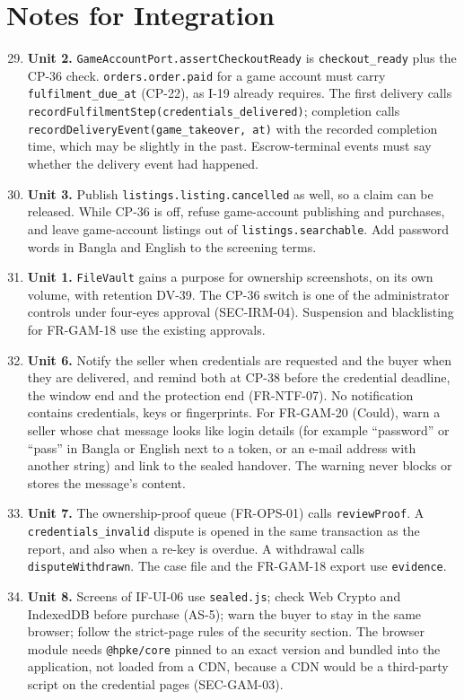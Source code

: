 \documentclass[11pt,a4paper]{article}
\begin{document}
\section{Notes for Integration}
\label{sec:notes}
\begin{enumerate}[label=\textbf{I-\arabic*}, leftmargin=*, nosep]
  \setcounter{enumi}{28}
  \item \textbf{Unit 2.} \texttt{GameAccountPort.assertCheckoutReady} is \texttt{checkout\_ready} plus the CP-36 check. \texttt{orders.order.paid} for a game account must carry \texttt{fulfilment\_due\_at} (CP-22), as I-19 already requires. The first delivery calls \texttt{recordFulfilmentStep(credentials\_delivered)}; completion calls \texttt{recordDeliveryEvent(game\_takeover, at)} with the recorded completion time, which may be slightly in the past. Escrow-terminal events must say whether the delivery event had happened.
  \item \textbf{Unit 3.} Publish \texttt{listings.listing.cancelled} as well, so a claim can be released. While CP-36 is off, refuse game-account publishing and purchases, and leave game-account listings out of \texttt{listings.searchable}. Add password words in Bangla and English to the screening terms.
  \item \textbf{Unit 1.} \texttt{FileVault} gains a purpose for ownership screenshots, on its own volume, with retention DV-39. The CP-36 switch is one of the administrator controls under four-eyes approval (SEC-IRM-04). Suspension and blacklisting for FR-GAM-18 use the existing approvals.
  \item \textbf{Unit 6.} Notify the seller when credentials are requested and the buyer when they are delivered, and remind both at CP-38 before the credential deadline, the window end and the protection end (FR-NTF-07). No notification contains credentials, keys or fingerprints. For FR-GAM-20 (Could), warn a seller whose chat message looks like login details (for example ``password'' or ``pass'' in Bangla or English next to a token, or an e-mail address with another string) and link to the sealed handover. The warning never blocks or stores the message's content.
  \item \textbf{Unit 7.} The ownership-proof queue (FR-OPS-01) calls \texttt{reviewProof}. A \texttt{credentials\_\allowbreak invalid} dispute is opened in the same transaction as the report, and also when a re-key is overdue. A withdrawal calls \texttt{disputeWithdrawn}. The case file and the FR-GAM-18 export use \texttt{evidence}.
  \item \textbf{Unit 8.} Screens of IF-UI-06 use \texttt{sealed.js}; check Web Crypto and IndexedDB before purchase (AS-5); warn the buyer to stay in the same browser; follow the strict-page rules of the security section. The browser module needs \texttt{@hpke/core} pinned to an exact version and bundled into the application, not loaded from a CDN, because a CDN would be a third-party script on the credential pages (SEC-GAM-03).

\end{enumerate}
\end{document}
